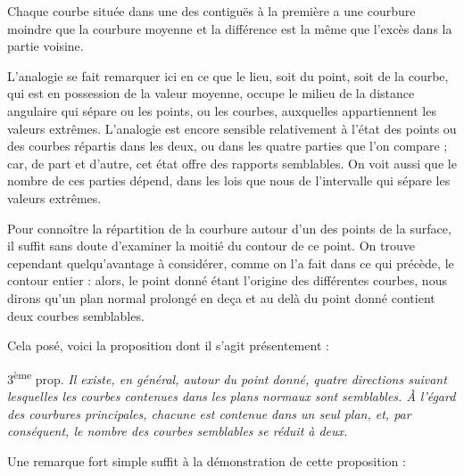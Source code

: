 \documentclass[11pt,a4paper]{article}
\begin{document}
Chaque courbe située dans une des  contiguës à la première
a une courbure moindre que la courbure moyenne et la différence est la même
que l'excès dans la partie voisine.

L'analogie se fait remarquer ici en ce que le lieu, soit du point, soit de la
courbe, qui est en possession de la valeur moyenne, occupe le milieu de la
distance angulaire qui sépare ou les points, ou les courbes, auxquelles
appartiennent les valeurs extrêmes. L'analogie est encore 
sensible relativement à l'état des points ou des courbes répartis dans les
deux, ou dans les quatre parties que l'on compare ; car, de part et d'autre,
cet état offre des rapports semblables. On voit aussi que le nombre de ces
parties dépend, dans les lois que nous \ill{} de l'intervalle qui sépare les
valeurs extrêmes.


Pour connoître la répartition de la courbure autour d'un des points de la
surface, il suffit sans doute d'examiner la moitié du contour de ce point. On
trouve cependant quelqu'avantage à considérer, comme on l'a fait dans ce qui
précède, le contour entier : alors, le point donné étant l'origine des
différentes courbes, nous dirons qu'un plan normal prolongé en deça et au
delà du point donné contient deux courbes semblables.

Cela posé, voici la proposition dont il s'agit présentement :

3\textsuperscript{ème} prop. \emph{Il existe, en général, autour du point
donné, quatre directions suivant lesquelles les courbes contenues dans les
plans normaux sont semblables. À l'égard des courbures principales, chacune
est contenue dans un seul plan, et, par conséquent, le nombre des courbes
semblables se réduit à deux.}

Une remarque fort simple suffit à la démonstration de cette proposition :
\end{document}
